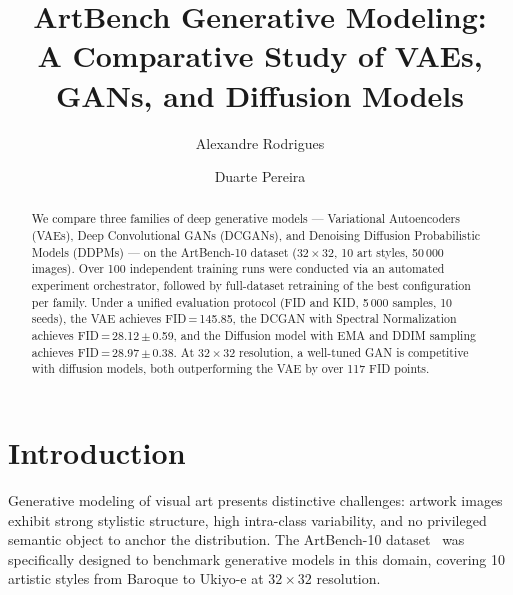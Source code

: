 \documentclass[runningheads]{llncs}
\begin{document}
\title{ArtBench Generative Modeling:\texorpdfstring{\\}{ }A Comparative Study of VAEs, GANs, and Diffusion Models}

\author{Alexandre Rodrigues \and
Duarte Pereira}



\maketitle

\begin{abstract}
We compare three families of deep generative models --- Variational Autoencoders (VAEs), Deep Convolutional GANs (DCGANs), and Denoising Diffusion Probabilistic Models (DDPMs) --- on the ArtBench-10 dataset ($32{\times}32$, 10 art styles, 50\,000 images). Over 100 independent training runs were conducted via an automated experiment orchestrator, followed by full-dataset retraining of the best configuration per family. Under a unified evaluation protocol (FID and KID, 5\,000 samples, 10 seeds), the VAE achieves FID\,=\,145.85, the DCGAN with Spectral Normalization achieves FID\,=\,28.12\,$\pm$\,0.59, and the Diffusion model with EMA and DDIM sampling achieves FID\,=\,28.97\,$\pm$\,0.38. At $32{\times}32$ resolution, a well-tuned GAN is competitive with diffusion models, both outperforming the VAE by over 117 FID points.
\end{abstract}

\section{Introduction}\label{sec:intro}

Generative modeling of visual art presents distinctive challenges: artwork images exhibit strong stylistic structure, high intra-class variability, and no privileged semantic object to anchor the distribution. The ArtBench-10 dataset~\cite{liao2022} was specifically designed to benchmark generative models in this domain, covering 10 artistic styles from Baroque to Ukiyo-e at $32{\times}32$ resolution.
\end{document}
